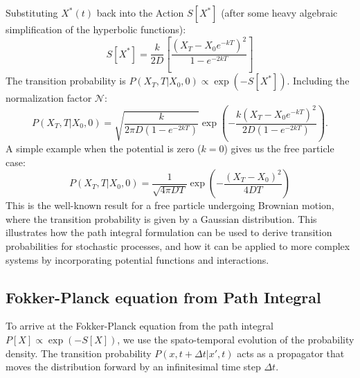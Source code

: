 \documentclass[12pt]{article}
\begin{document}
\begin{singlespace}
Substituting $X^*(t)$ back into the Action $S[X^*]$ (after some heavy algebraic simplification of the hyperbolic functions):
\begin{equation}
S[X^*] = \frac{k}{2D} \left[ \frac{(X_T - X_0 e^{-kT})^2}{1 - e^{-2kT}} \right]
\end{equation}
The transition probability is $P(X_T, T | X_0, 0) \propto \exp(-S[X^*])$. Including the normalization factor $\mathcal{N}$:
\begin{equation}
P(X_T, T | X_0, 0) = \sqrt{\frac{k}{2\pi D(1 - e^{-2kT})}} \exp\left( -\frac{k(X_T - X_0 e^{-kT})^2}{2D(1 - e^{-2kT})} \right).
\end{equation}
A simple example when the potential is zero ($k=0$) gives us the free particle case:
\begin{equation}P(X_T, T | X_0, 0) = \frac{1}{\sqrt{4\pi D T}} \exp\left( -\frac{(X_T - X_0)^2}{4D T} \right)\end{equation}
This is the well-known result for a free particle undergoing Brownian motion, where the transition probability is given by a Gaussian distribution. This illustrates how the path integral formulation can be used to derive transition probabilities for stochastic processes, and how it can be applied to more complex systems by incorporating potential functions and interactions.

\subsection{Fokker-Planck equation from Path Integral}

To arrive at the Fokker-Planck equation from the path integral $P[X] \propto \exp(-S[X])$, we use the spato-temporal evolution of the probability density. The transition probability $P(x, t+\Delta t | x', t)$ acts as a propagator that moves the distribution forward by an infinitesimal time step $\Delta t$.


\end{singlespace}
\end{document}
